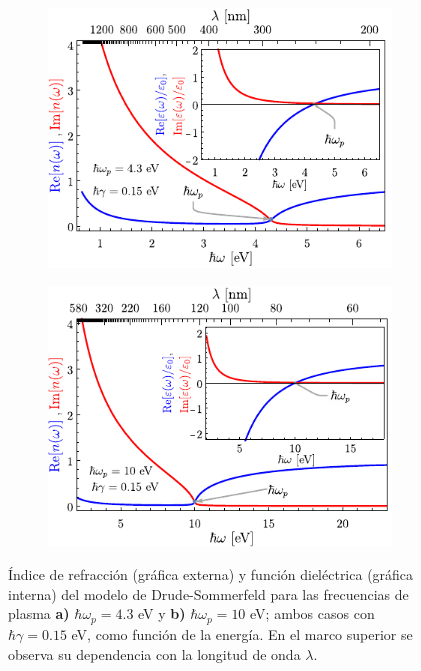 	\begin{figure}[h!]\centering\hspace*{-1.5em}
	\begin{subfigure}{.01\linewidth}\caption{}\label{sfig:Drude4eV}\vspace{3.75cm}\end{subfigure}
	\begin{subfigure}{.45\linewidth}\hspace*{-1em}
	\includegraphics[scale=1]{1-Teoria/figs/1-4-varepsn4eV.pdf}
	\end{subfigure}\hspace*{.5em}
	\begin{subfigure}{.01\linewidth}\caption{}\label{sfig:Drude10eV}\vspace{3.75cm}\end{subfigure}
	\begin{subfigure}{.45\linewidth}\hspace*{-1em}
	\includegraphics[scale=1 ]{1-Teoria/figs/1-4-varepsn10eV.pdf}
	\end{subfigure}\vspace*{-.7em}
	\caption{ Índice de refracción (gráfica externa) y función dieléctrica (gráfica interna) del modelo de Drude-Sommerfeld para las frecuencias de plasma \textbf{a)} $\hbar\omega_p=4. 3$ eV y \textbf{b)} $\hbar\omega_p=10$ eV; ambos casos con $\hbar\gamma=0. 15$ eV, como función de la energía.  En el marco superior se observa su dependencia con la longitud de onda $\lambda$. }\label{fig:Drude}
	\end{figure}	

